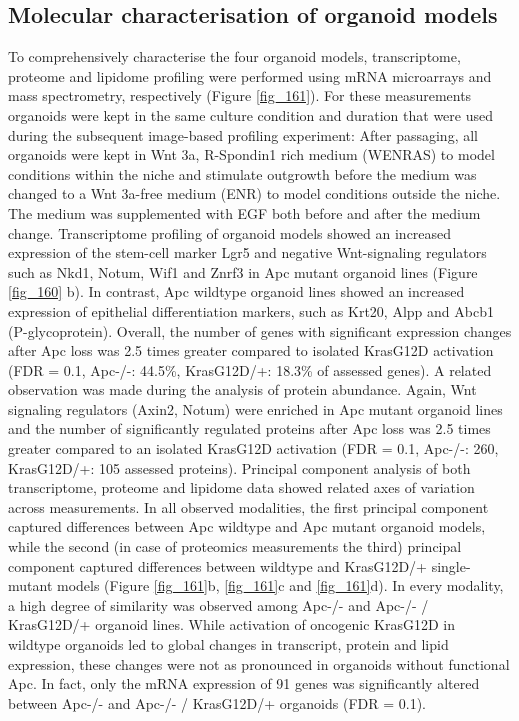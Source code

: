 \begin{flushleft}
\subsection{Molecular characterisation of organoid models}
To comprehensively characterise the four organoid models, transcriptome, proteome and lipidome profiling were performed using mRNA microarrays and mass spectrometry, respectively (Figure \ref{fig_161}). For these measurements organoids were kept in the same culture condition and duration that were used during the subsequent image-based profiling experiment: After passaging, all organoids were kept in Wnt 3a, R-Spondin1 rich medium (WENRAS) to model conditions within the niche and stimulate outgrowth before the medium was changed to a Wnt 3a-free medium (ENR) to model conditions outside the niche. The medium was supplemented with EGF both before and after the medium change. Transcriptome profiling of organoid models showed an increased expression of the stem-cell marker Lgr5 and negative Wnt-signaling regulators such as Nkd1, Notum, Wif1 and Znrf3 in Apc mutant organoid lines (Figure \ref{fig_160} b). In contrast, Apc wildtype organoid lines showed an increased expression of epithelial differentiation markers, such as Krt20, Alpp and Abcb1 (P-glycoprotein). Overall, the number of genes with significant expression changes after Apc loss was 2.5 times greater compared to isolated KrasG12D activation (FDR = 0.1, Apc-/-: 44.5\%, KrasG12D/+: 18.3\% of assessed genes). A related observation was made during the analysis of protein abundance. Again, Wnt signaling regulators (Axin2, Notum) were enriched in Apc mutant organoid lines and the number of significantly regulated proteins after Apc loss was 2.5 times greater compared to an isolated KrasG12D activation (FDR = 0.1, Apc-/-: 260, KrasG12D/+: 105 assessed proteins). Principal component analysis of both transcriptome, proteome and lipidome data showed related axes of variation across measurements. In all observed modalities, the first principal component captured differences between Apc wildtype and Apc mutant organoid models, while the second (in case of proteomics measurements the third) principal component captured differences between wildtype and KrasG12D/+ single-mutant models (Figure \ref{fig_161}b, \ref{fig_161}c and \ref{fig_161}d). In every modality, a high degree of similarity was observed among Apc-/- and Apc-/- / KrasG12D/+ organoid lines. While activation of oncogenic KrasG12D in wildtype organoids led to global changes in transcript, protein and lipid expression, these changes were not as pronounced in organoids without functional Apc. In fact, only the mRNA expression of 91 genes was significantly altered between Apc-/- and Apc-/- / KrasG12D/+ organoids (FDR = 0.1). 


\end{flushleft}
